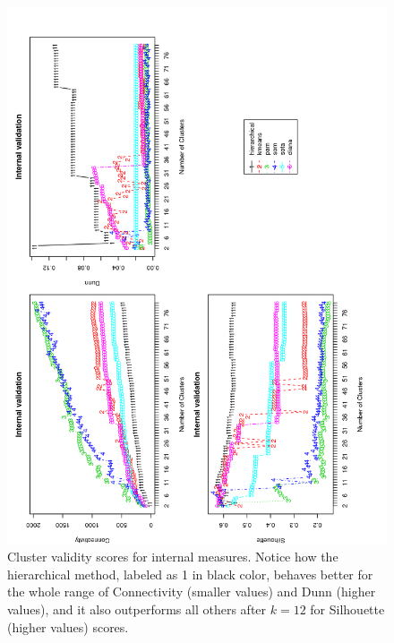 \begin{figure}
 \centering
\includegraphics[angle=0, scale=0.38]{Chapter2/STval_int.png}
\caption{Cluster validity scores for internal measures. Notice how the
  hierarchical method, labeled as 1 in black color,
  behaves better for the whole range of Connectivity (smaller values)
  and Dunn (higher values),
  and it also outperforms all others after $k=12$ for Silhouette
  (higher values) scores.}
 \label{fig:internal}
\end{figure}

